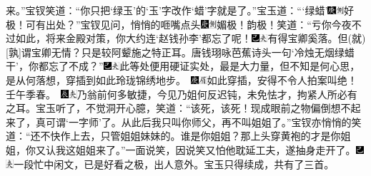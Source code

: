 来。”宝钗笑道：“你只把‘绿玉’的‘玉’字改作‘蜡’字就是了。”宝玉道：“‘绿蜡’{\includegraphics[width=3mm]{../Images/00004}\includegraphics[width=3mm]{../Images/00011}\footnotesize \kaishu 好极！}可有出处？”宝钗见问，悄悄的咂嘴点头{\includegraphics[width=3mm]{../Images/00004}\includegraphics[width=3mm]{../Images/00011}\footnotesize \kaishu 媚极！韵极！}笑道：“亏你今夜不过如此，将来金殿对策，你大约连‘赵钱孙李’都忘了呢！{\includegraphics[width=3mm]{../Images/00003}\includegraphics[width=3mm]{../Images/00012}\footnotesize \kaishu 有得宝卿奚落。但{(就)}{[}孰{]}谓宝卿无情？只是较阿颦施之特正耳。}唐钱珝咏芭蕉诗头一句‘冷烛无烟绿蜡干’，你都忘了不成？”{\includegraphics[width=3mm]{../Images/00003}\includegraphics[width=3mm]{../Images/00012}\footnotesize \kaishu 此等处便用硬证实处，最是大力量，但不知是何心思，是从何落想，穿插到如此玲珑锦绣地步。　{\includegraphics[width=3mm]{../Images/00004}\includegraphics[width=3mm]{../Images/00010}\footnotesize \kaishu 如此穿插，安得不令人拍案叫绝！壬午季春。　}\includegraphics[width=3mm]{../Images/00009}\includegraphics[width=3mm]{../Images/00012}\footnotesize \kaishu 乃翁前何多敏捷，今见乃姐何反迟钝，未免怯才，拘紧人所必有之耳。}宝玉听了，不觉洞开心臆，笑道：“该死，该死！现成眼前之物偏倒想不起来了，真可谓‘一字师’了。从此后我只叫你师父，再不叫姐姐了。”宝钗亦悄悄的笑道：“还不快作上去，只管姐姐妹妹的。谁是你姐姐？那上头穿黄袍的才是你姐姐，你又认我这姐姐来了。”一面说笑，因说笑又怕他耽延工夫，遂抽身走开了。{\includegraphics[width=3mm]{../Images/00003}\includegraphics[width=3mm]{../Images/00012}\footnotesize \kaishu 一段忙中闲文，已是好看之极，出人意外。}宝玉只得续成，共有了三首。


